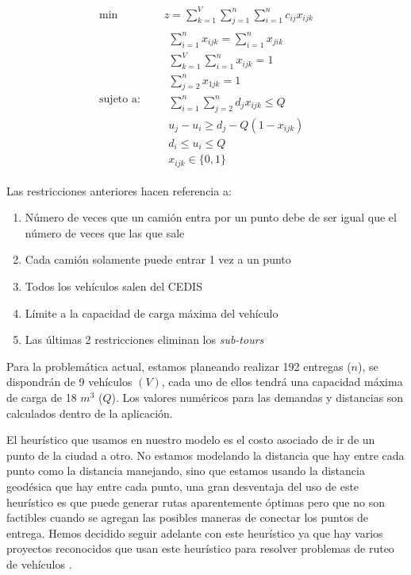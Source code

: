 \documentclass[journal]{IEEEtran}
\begin{document}
        \begin{equation*}
            \begin{aligned}
                \text{min } \quad & z = \sum_{k=1}^{V} \sum_{j=1}^{n} \sum_{i=1}^{n} c_{ij} x_{ijk}\\
                \text{sujeto a: }\quad &
                \begin{array}{c}
                    \displaystyle\sum_{i=1}^{n} x_{ijk} = \sum_{i=1}^{n} x_{jik} \\[3pt]
                    \displaystyle\sum_{k=1}^{V} \sum_{i=1}^{n} x_{ijk} = 1 \\[3pt]
                    \displaystyle\sum_{j=2}^{n} x_{1jk} = 1 \\[3pt]
                    \displaystyle\sum_{i=1}^{n} \sum_{j=2}^{n} d_{j} x_{ijk} \leq Q \\[3pt]
                    u_{j} - u_{i} \geq d_j - Q (1 - x_{ijk}) \\[3pt]
                    d_i \leq u_i \leq Q \\[3pt]
                    x_{ijk} \in \{0, 1\}
                \end{array}
            \end{aligned}
        \end{equation*}
        
        Las restricciones anteriores hacen referencia a:
        \begin{enumerate}
            \item Número de veces que un camión entra por un punto debe de ser igual que el número de veces que las que sale
            \item Cada camión solamente puede entrar 1 vez a un punto
            \item Todos los vehículos salen del CEDIS
            \item Límite a la capacidad de carga máxima del vehículo
            \item Las últimas 2 restricciones eliminan los \emph{sub-tours}
        \end{enumerate}
        
        Para la problemática actual, estamos planeando realizar 192 entregas ($n$), se dispondrán de 9 vehículos $(V)$, cada uno de ellos tendrá una capacidad máxima de carga de 18 $m^3$ ($Q$). Los valores numéricos para las demandas y distancias son calculados dentro de la aplicación.
        
        El heurístico que usamos en nuestro modelo es el costo asociado de ir de un punto de la ciudad a otro. No estamos modelando la distancia que hay entre cada punto como la distancia manejando, sino que estamos usando la distancia geodésica que hay entre cada punto, una gran desventaja del uso de este heurístico es que puede generar rutas aparentemente óptimas pero que no son factibles cuando se agregan las posibles maneras de conectar los puntos de entrega. Hemos decidido seguir adelante con este heurístico ya que hay varios proyectos reconocidos que usan este heurístico para resolver problemas de ruteo de vehículos \cite{ERDOGAN201762}.
\end{document}
